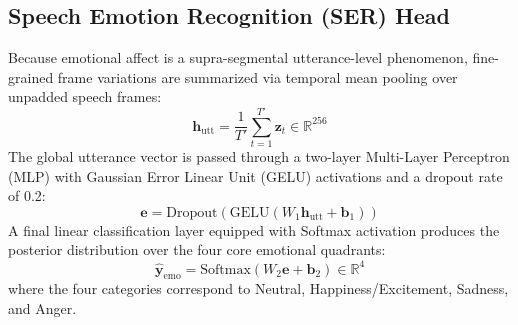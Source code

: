 \subsection{Speech Emotion Recognition (SER) Head}
Because emotional affect is a supra-segmental utterance-level phenomenon, fine-grained frame variations are summarized via temporal mean pooling over unpadded speech frames:
\begin{equation}
    \mathbf{h}_{\text{utt}} = \frac{1}{T'} \sum_{t=1}^{T'} \mathbf{z}_t \in \mathbb{R}^{256}
\end{equation}
The global utterance vector is passed through a two-layer Multi-Layer Perceptron (MLP) with Gaussian Error Linear Unit (GELU) activations and a dropout rate of 0.2:
\begin{equation}
    \mathbf{e} = \text{Dropout}\left(\text{GELU}\left(W_1 \mathbf{h}_{\text{utt}} + \mathbf{b}_1\right)\right)
\end{equation}
A final linear classification layer equipped with Softmax activation produces the posterior distribution over the four core emotional quadrants:
\begin{equation}
    \hat{\mathbf{y}}_{\text{emo}} = \text{Softmax}\left(W_2 \mathbf{e} + \mathbf{b}_2\right) \in \mathbb{R}^4
\end{equation}
where the four categories correspond to Neutral, Happiness/Excitement, Sadness, and Anger.
